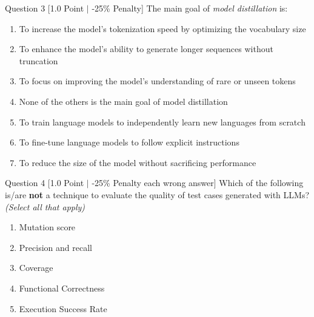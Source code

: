 \documentclass[11pt,a4paper]{article}
\begin{document}
\begin{questionbox}{Question 3 \hfill [1.0 Point $\vert$ -25\% Penalty]}
The main goal of \textit{model distillation} is:
\begin{enumerate}[label=(\alph*)]
    \item To increase the model's tokenization speed by optimizing the vocabulary size
    \item To enhance the model's ability to generate longer sequences without truncation
    \item To focus on improving the model's understanding of rare or unseen tokens
    \item None of the others is the main goal of model distillation
    \item To train language models to independently learn new languages from scratch
    \item To fine-tune language models to follow explicit instructions
    \item To reduce the size of the model without sacrificing performance
\end{enumerate}
\end{questionbox}

\bigskip

\begin{questionbox}{Question 4 \hfill [1.0 Point $\vert$ -25\% Penalty each wrong answer]}
Which of the following is/are \textbf{not} a technique to evaluate the quality of test cases generated with LLMs? \textit{(Select all that apply)}
\begin{enumerate}[label=(\alph*)]
    \item Mutation score
    \item Precision and recall
    \item Coverage
    \item Functional Correctness
    \item Execution Success Rate
\end{enumerate}
\end{questionbox}

\bigskip
\end{document}
